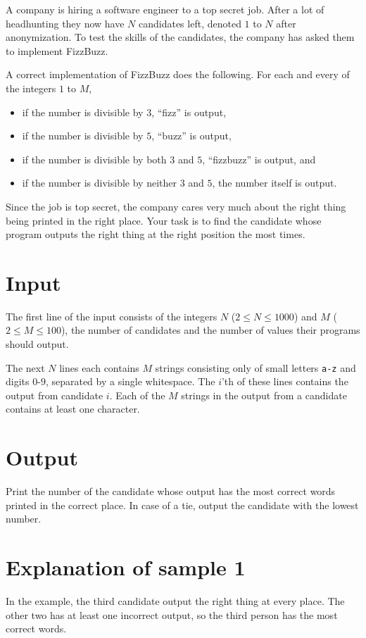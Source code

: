 A company is hiring a software engineer to a top secret job.
After a lot of headhunting they now have $N$ candidates left, denoted $1$ to $N$ after anonymization.
To test the skills of the candidates, the company has asked them to implement FizzBuzz.

A correct implementation of FizzBuzz does the following.
For each and every of the integers $1$ to $M$,
\begin{itemize}
  \item if the number is divisible by $3$, ``fizz'' is output,
  \item if the number is divisible by $5$, ``buzz'' is output,
  \item if the number is divisible by both $3$ and $5$, ``fizzbuzz'' is output, and
  \item if the number is divisible by neither $3$ and $5$, the number itself is output.
\end{itemize}

Since the job is top secret, the company cares very much about the right thing being printed in the right place.
Your task is to find the candidate whose program outputs the right thing at the right position the most times.

\section*{Input}
The first line of the input consists of the integers $N$ ($2 \leq N \leq 1000$) and $M$ ($2 \leq M \leq 100$), the number of candidates and the number of values their programs should output.

The next $N$ lines each contains $M$ strings consisting only of small letters \texttt{a-z} and digits $0$-$9$, separated by a single whitespace.
The $i$'th of these lines contains the output from candidate $i$.
Each of the $M$ strings in the output from a candidate contains at least one character.

\section*{Output}
Print the number of the candidate whose output has the most correct words printed in the correct place.
In case of a tie, output the candidate with the lowest number.

\section*{Explanation of sample 1}
In the example, the third candidate output the right thing at every place.
The other two has at least one incorrect output, so the third person has the most correct words.
